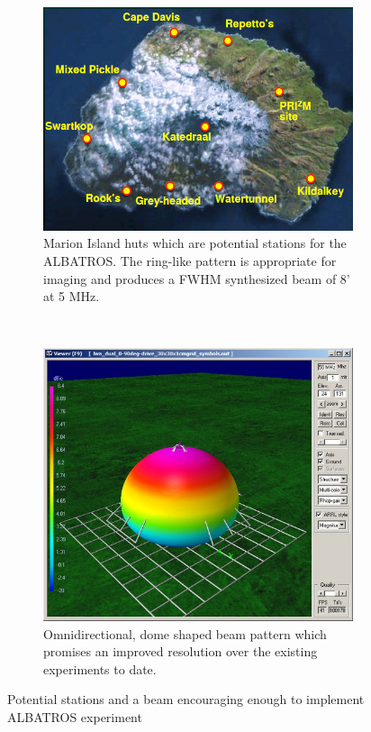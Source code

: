 \documentclass{ws-jai}
\begin{document}
\begin{figure}[h]
	\centering
	\begin{subfigure}[t]{0.5\textwidth}
		\centering
		\includegraphics[width=.9\linewidth]{Figures/site.PNG}
		\caption{Marion Island huts which are potential stations for the ALBATROS. The ring-like pattern is appropriate for imaging and produces a FWHM synthesized beam of 8' at 5 MHz.}
		\label{Fig:Marion}
	\end{subfigure}%
	~~~			
	\begin{subfigure}[t]{0.5\textwidth}
		\centering
		\includegraphics[width=.9\linewidth]{Figures/beam.png}
		\caption{Omnidirectional, dome shaped beam pattern which promises an improved resolution over the existing experiments to date.}
		\label{Fig:beam}
	\end{subfigure}
	\caption{Potential stations and a beam encouraging enough to implement ALBATROS experiment}
	\label{Fig:10}
\end{figure}
\end{document}
